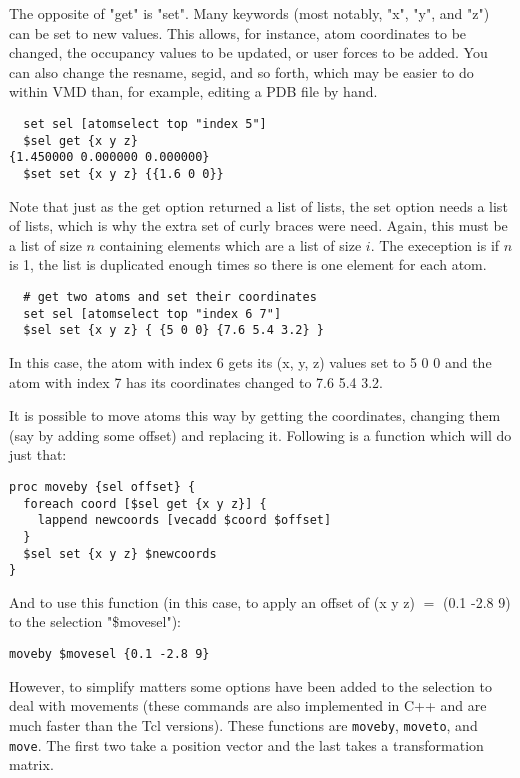 The opposite of "get" is "set".  Many keywords (most notably,
"x", "y", and "z") can be set to new values.  This allows, for
instance, atom coordinates to be changed, the occupancy values to be
updated, or user forces to be added.  You can also change the resname,
segid, and so forth, which may be easier to do within VMD than, for
example, editing a PDB file by hand.
\begin{verbatim}
  set sel [atomselect top "index 5"]
  $sel get {x y z}
{1.450000 0.000000 0.000000}
  $set set {x y z} {{1.6 0 0}}
\end{verbatim}

Note that just as the get option returned a list of lists, the set
option needs a list of lists, which is why the extra set of curly
braces were need.  Again, this must be a list of size $n$
containing elements which are a list of size $i$.  The exeception is
if $n$ is 1, the list is duplicated enough times so there is one
element for each atom.
\begin{verbatim}
  # get two atoms and set their coordinates
  set sel [atomselect top "index 6 7"]
  $sel set {x y z} { {5 0 0} {7.6 5.4 3.2} }
\end{verbatim}

In this case, the atom with index 6 gets its (x, y, z) values set to
{5 0 0} and the atom with index 7 has its coordinates changed to {7.6
5.4 3.2}.

  It is possible to move atoms this way by getting the coordinates,
changing them (say by adding some offset) and replacing it.  Following is a function which will do just that:

\begin{verbatim}
proc moveby {sel offset} {
  foreach coord [$sel get {x y z}] {
    lappend newcoords [vecadd $coord $offset]
  }
  $sel set {x y z} $newcoords
}
\end{verbatim}
And to use this function (in this case, to apply an offset of (x y z)
$=$ (0.1 -2.8 9) to the selection "\$movesel"):
\begin{verbatim}
moveby $movesel {0.1 -2.8 9}
\end{verbatim}
However, to simplify matters some options have been added to the
selection to deal with movements (these commands are also implemented
in C++ and are much faster than the Tcl versions).  These functions
are {\tt moveby}, {\tt moveto}, and {\tt move}.  The first two take a
position vector and the last takes a transformation matrix.

